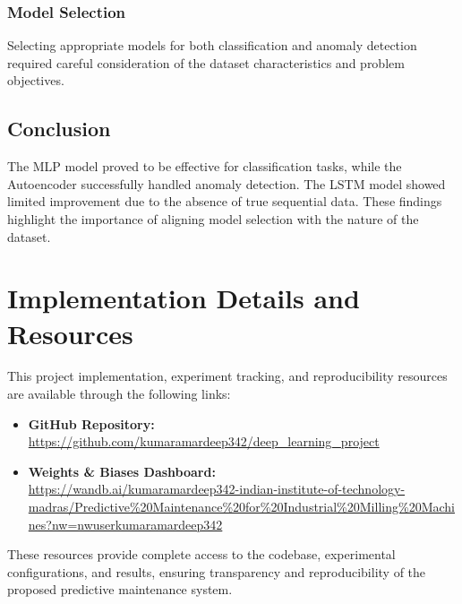 \documentclass{ecsproject}     %
\begin{document}
\subsection{Model Selection}

Selecting appropriate models for both classification and anomaly detection required careful consideration of the dataset characteristics and problem objectives.

\section{Conclusion}

The MLP model proved to be effective for classification tasks, while the Autoencoder successfully handled anomaly detection. The LSTM model showed limited improvement due to the absence of true sequential data. These findings highlight the importance of aligning model selection with the nature of the dataset.

\chapter{Implementation Details and Resources}

This project implementation, experiment tracking, and reproducibility resources are available through the following links:

\begin{itemize}
    \item \textbf{GitHub Repository:} \\
    \url{https://github.com/kumaramardeep342/deep_learning_project}
    
    \item \textbf{Weights \& Biases Dashboard:} \\
    \url{ https://wandb.ai/kumaramardeep342-indian-institute-of-technology-madras/Predictive%20Maintenance%20for%20Industrial%20Milling%20Machines?nw=nwuserkumaramardeep342}
\end{itemize}


These resources provide complete access to the codebase, experimental configurations, and results, ensuring transparency and reproducibility of the proposed predictive maintenance system.



\end{document}

